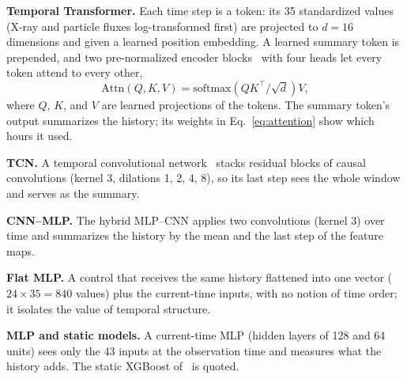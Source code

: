 \documentclass[10pt,twocolumn,letterpaper]{article}
\begin{document}
\textbf{Temporal Transformer.} Each time step is a token: its 35
standardized values (X-ray and particle fluxes log-transformed first) are
projected to $d=16$ dimensions and given a learned position embedding. A
learned summary token is prepended, and two pre-normalized encoder
blocks~\cite{vaswani2017} with four heads let every token attend to every
other,
\begin{equation}
\mathrm{Attn}(Q,K,V)=\mathrm{softmax}\!\left(QK^\top/\sqrt{d}\right)V,
\label{eq:attention}
\end{equation}
where $Q$, $K$, and $V$ are learned projections of the tokens. The summary
token's output summarizes the history; its weights in
Eq.~\eqref{eq:attention} show which hours it used.

\textbf{TCN.} A temporal convolutional network~\cite{bai2018} stacks
residual blocks of causal convolutions (kernel 3, dilations 1, 2, 4, 8), so
its last step sees the whole window and serves as the summary.

\textbf{CNN--MLP.} The hybrid MLP--CNN applies two convolutions (kernel 3)
over time and summarizes the history by the mean and the last step of the
feature maps.

\textbf{Flat MLP.} A control that receives the same history flattened into
one vector ($24\times35=840$ values) plus the current-time inputs, with no
notion of time order; it isolates the value of temporal structure.

\textbf{MLP and static models.} A current-time MLP (hidden layers of 128 and
64 units) sees only the 43 inputs at the observation time and measures what
the history adds. The static XGBoost of~\cite{kc2025} is quoted.
\end{document}
